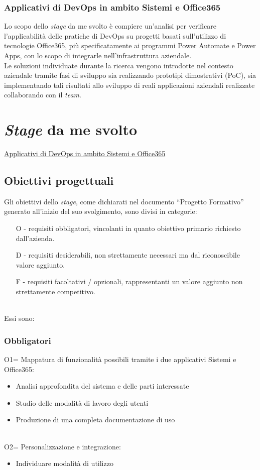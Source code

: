 \subsubsection*{Applicativi di \gls{DevOps} in ambito Sistemi e Office365}
\label{mioStage}
Lo scopo dello \emph{stage} da me svolto è compiere un'analisi per verificare l'applicabilità delle pratiche di \gls{DevOps} su progetti basati sull'utilizzo di tecnologie Office365, più specificatamente ai programmi Power Automate e Power Apps, con lo scopo di integrarle nell'infrastruttura aziendale.\\
Le soluzioni individuate durante la ricerca vengono introdotte nel contesto aziendale tramite fasi di sviluppo sia realizzando prototipi dimostrativi (\gls{PoC}), sia implementando tali risultati allo sviluppo di reali applicazioni aziendali realizzate collaborando con il \emph{team}. 

\section{\emph{Stage} da me svolto}
\hyperref[mioStage]{Applicativi di DevOps in ambito Sistemi e Office365}
\subsection{Obiettivi progettuali}
Gli obiettivi dello \emph{stage}, come dichiarati nel documento “Progetto Formativo” generato all'inizio del suo svolgimento, sono divisi in categorie:
\begin{enumerate}
	\item[O -]requisiti obbligatori, vincolanti in quanto obiettivo primario richiesto dall'azienda.
    \item[D -]requisiti desiderabili, non strettamente necessari ma dal riconoscibile valore aggiunto.
    \item[F -]requisiti facoltativi / opzionali, rappresentanti un valore aggiunto non strettamente competitivo.\\\\
\end{enumerate}
Essi sono:
\subsubsection*{Obbligatori}
O1= Mappatura di funzionalità possibili tramite i due applicativi \gls{Sistemi} e Office365:
\begin{itemize}
    \item Analisi approfondita del sistema e delle parti interessate 
    \item Studio delle modalità di lavoro degli utenti 
    \item Produzione di una completa documentazione di uso\\\\
\end{itemize}
O2= Personalizzazione e integrazione:
\begin{itemize}
    \item Individuare modalità di utilizzo\\\\
\end{itemize}
